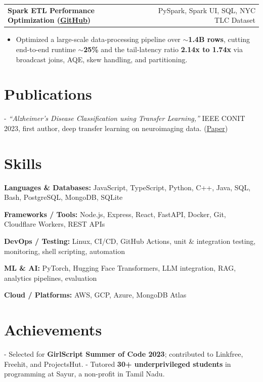 \documentclass[letterpaper,11pt]{article}
\makeatletter
\newcommand{\projItem}[2]{%
  \vspace{6pt}
  \begin{tabular*}{\textwidth}{@{}l@{\extracolsep{\fill}}r@{}}
    \textbf{#1} & #2 \\
  \end{tabular*}\par\vspace{-2pt}
}
\newcommand{\skillLine}[2]{\textbf{#1:} #2\par\vspace{2pt}}
\newcommand{\inlineBlock}[1]{{\setlength{\leftskip}{0.18in}\small #1\par}}
\makeatother
\begin{document}
\projItem{Spark ETL Performance Optimization {\normalfont\small(\href{https://github.com/Deva-1903/Spark-ETL-Optimization}{GitHub})}}{PySpark, Spark UI, SQL, NYC TLC Dataset}
\begin{itemize}
  \item Optimized a large-scale data-processing pipeline over \textbf{$\sim$1.4B rows}, cutting end-to-end runtime \textbf{$\sim$25\%} and the tail-latency ratio \textbf{2.14x to 1.74x} via broadcast joins, AQE, skew handling, and partitioning.
\end{itemize}

\section{Publications}
\inlineBlock{- \textit{``Alzheimer's Disease Classification using Transfer Learning,''} IEEE CONIT 2023, first author, deep transfer learning on neuroimaging data. {\normalfont\small(\href{https://ieeexplore.ieee.org/document/10205760}{Paper})}}

\section{Skills}
\skillLine{Languages \& Databases}{JavaScript, TypeScript, Python, C++, Java, SQL, Bash, PostgreSQL, MongoDB, SQLite}
\skillLine{Frameworks / Tools}{Node.js, Express, React, FastAPI, Docker, Git, Cloudflare Workers, REST APIs}
\skillLine{DevOps / Testing}{Linux, CI/CD, GitHub Actions, unit \& integration testing, monitoring, shell scripting, automation}
\skillLine{ML \& AI}{PyTorch, Hugging Face Transformers, LLM integration, RAG, analytics pipelines, evaluation}
\skillLine{Cloud / Platforms}{AWS, GCP, Azure, MongoDB Atlas}

\section{Achievements}
\inlineBlock{- Selected for \textbf{GirlScript Summer of Code 2023}; contributed to Linkfree, Freehit, and ProjectsHut. - Tutored \textbf{30+ underprivileged students} in programming at Sayur, a non-profit in Tamil Nadu.}
\end{document}
